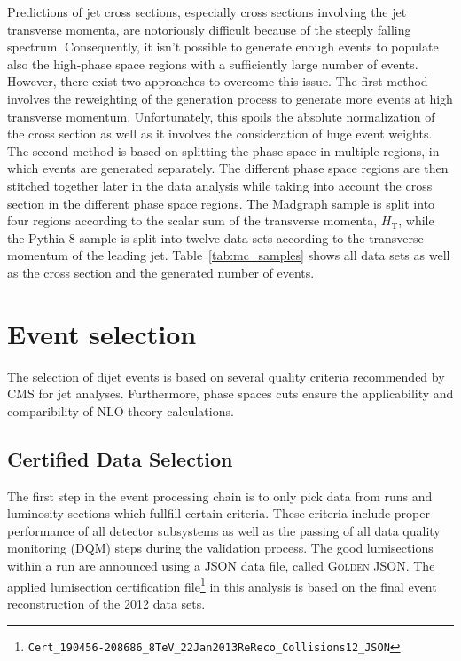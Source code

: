 Predictions of jet cross sections, especially cross sections involving the jet
transverse momenta, are notoriously difficult because of the steeply falling
spectrum. Consequently, it isn't possible to generate enough events to populate
also the high-\pt phase space regions with a sufficiently large number of
events. However, there exist two approaches to overcome this issue. The first
method involves the reweighting of the generation process to generate more
events at high transverse momentum. Unfortunately, this spoils the absolute
normalization of the cross section as well as it involves the consideration of
huge event weights. The second method is based on splitting the phase space in
multiple regions, in which events are generated separately. The
different phase space regions are then stitched together later in the data
analysis while taking into account the cross section in the different phase
space regions. The Madgraph sample is split into four regions according to the
scalar sum of the transverse momenta, $H_{\mathrm{T}}$, while the Pythia 8
sample is split into twelve data sets according to the transverse momentum of
the leading jet. Table~\ref{tab:mc_samples} shows all data sets
as well as the cross section and the generated number of events.

\section{Event selection}
\label{sec:event_selection}

The selection of dijet events is based on several quality criteria recommended by CMS
for jet analyses. Furthermore, phase spaces cuts ensure the applicability and
comparibility of NLO theory calculations.

\subsection{Certified Data Selection}

The first step in the event processing chain is to only pick data from runs and
luminosity sections which fullfill certain criteria. These criteria include
proper performance of all detector subsystems as well as the passing of all data
quality monitoring (DQM) steps during the validation process. The good
lumisections within a run are announced using a JSON data file, called
\textsc{Golden JSON}. The applied lumisection certification
file\footnote{\texttt{Cert\_190456-208686\_8TeV\_22Jan2013ReReco\_Collisions12\_JSON}}
in this analysis is based on the final event reconstruction of the 2012 data
sets.


